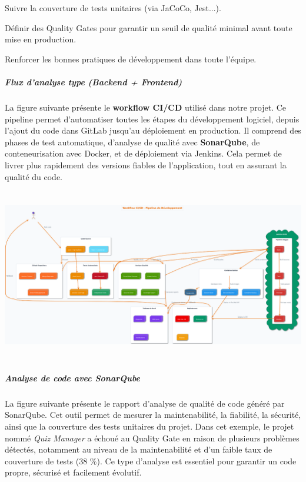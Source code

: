 \documentclass[12pt,a4paper,twoside]{report}
\begin{document}
Suivre la couverture de tests unitaires (via JaCoCo, Jest...).

Définir des Quality Gates pour garantir un seuil de qualité minimal
avant toute mise en production.

Renforcer les bonnes pratiques de développement dans toute l'équipe.

\hypertarget{flux-danalyse-type-backend-frontend}{%
\subparagraph{Flux d'analyse type (Backend +
Frontend)}\label{flux-danalyse-type-backend-frontend}}

La figure suivante présente le \textbf{workflow CI/CD} utilisé dans
notre projet. Ce pipeline permet d'automatiser toutes les étapes du
développement logiciel, depuis l'ajout du code dans GitLab jusqu'au
déploiement en production. Il comprend des phases de test automatique,
d'analyse de qualité avec \textbf{SonarQube}, de conteneurisation avec
Docker, et de déploiement via Jenkins. Cela permet de livrer plus
rapidement des versions fiables de l'application, tout en assurant la
qualité du code.

\includegraphics[width=6.29921in,height=2.96457in]{latex_media/media/image42.png}

\hypertarget{analyse-de-code-avec-sonarqube}{%
\subparagraph{Analyse de code avec
SonarQube}\label{analyse-de-code-avec-sonarqube}}

La figure suivante présente le rapport d'analyse de qualité de code
généré par SonarQube. Cet outil permet de mesurer la maintenabilité, la
fiabilité, la sécurité, ainsi que la couverture des tests unitaires du
projet. Dans cet exemple, le projet nommé \emph{Quiz Manager} a échoué
au Quality Gate en raison de plusieurs problèmes détectés, notamment au
niveau de la maintenabilité et d'un faible taux de couverture de tests
(38 \%). Ce type d'analyse est essentiel pour garantir un code propre,
sécurisé et facilement évolutif.
\end{document}
